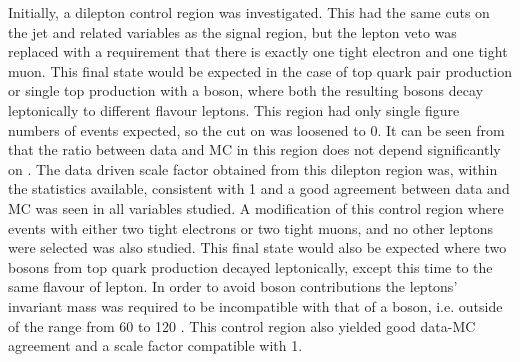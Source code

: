 Initially, a dilepton control region was investigated. This had the same cuts on the jet and \MET related variables as the signal region, but the lepton veto was replaced with a requirement that there is exactly one tight electron and one tight muon. This final state would be expected in the case of top quark pair production or single top production with a \PW boson, where both the resulting \PW bosons decay leptonically to different flavour leptons. This region had only single figure numbers of events expected, so the cut on \jetmetdphi was loosened to 0. It can be seen from  that the ratio between data and MC in this region does not depend significantly on \jetmetdphi. The data driven scale factor obtained from this dilepton region was, within the statistics available, consistent with 1 and a good agreement between data and \ac{MC} was seen in all variables studied. A modification of this control region where events with either two tight electrons or two tight muons, and no other leptons were selected was also studied. This final state would also be expected where two \PW bosons from top quark production decayed leptonically, except this time to the same flavour of lepton. In order to avoid \PZ boson contributions the leptons' invariant mass was required to be incompatible with that of a \PZ boson, i.e. outside of the range from 60 to 120 \GeV. This control region also yielded good data-\ac{MC} agreement and a scale factor compatible with 1. 

